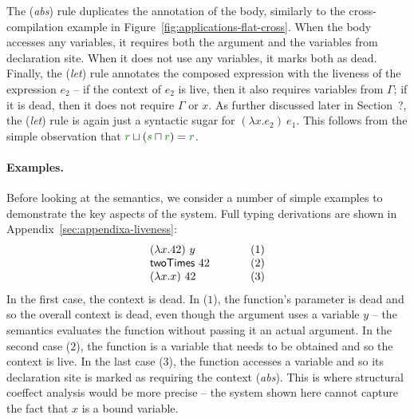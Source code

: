 The (\emph{abs}) rule duplicates the annotation of the body, similarly to the cross-compilation 
example in Figure~\ref{fig:applications-flat-cross}. When the body accesses any variables, it 
requires both the argument and the variables from declaration site. When it does not use any variables,
it marks both as dead. Finally, the (\emph{let}) rule annotates the composed expression with the
liveness of the expression $e_2$ -- if the context of $e_2$ is live, then it also requires variables
from $\Gamma$; if it is dead, then it does not require $\Gamma$ or $x$. 
As further discussed later in Section~?, the (\emph{let}) rule is again just a syntactic sugar for 
$(\lambda x.e_2)~e_1$. This follows from the simple observation that 
$\cclrd{r} \sqcup (\cclrd{s} \sqcap \cclrd{r}) = \cclrd{r}$.


\paragraph{Examples.}
Before looking at the semantics, we consider a number of simple examples to demonstrate the
key aspects of the system. Full typing derivations are shown in Appendix~\ref{sec:appendixa-liveness}:
%
\begin{equation*}
\begin{array}{lll}
(\lambda x . 42)~y &~\hspace{1em}~&(1)\\
\textnormal{\sffamily twoTimes}~42          &&(2)\\
(\lambda x . x)~42 &&(3)\\
\end{array}
\end{equation*}
%
In the first case, the context is dead. In ($1$), the function's parameter is dead and so the
overall context is dead, even though the argument uses a variable $y$ -- the semantics evaluates 
the function without passing it an actual argument. In the second case ($2$), the function is
a variable that needs to be obtained and so the context is live. In the last case ($3$), the 
function accesses a variable and so its declaration site is marked as requiring the context 
(\emph{abs}). This is where structural coeffect analysis would be more precise -- the system shown
here cannot capture the fact that $x$ is a bound variable.


